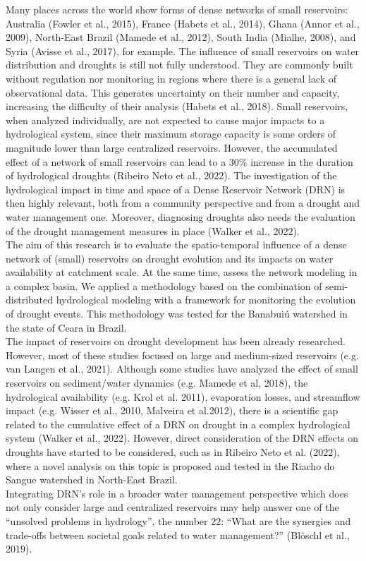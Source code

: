 \documentclass[draft]{agujournal2019}
\begin{document}
Many places across the world show forms of dense networks of small reservoirs: Australia (Fowler et al., 2015), France (Habets et al., 2014), Ghana (Annor et al., 2009), North-East Brazil (Mamede et al., 2012), South India (Mialhe, 2008), and Syria (Avisse et al., 2017), for example. The influence of small reservoirs on water distribution and droughts is still not fully understood. They are commonly built without regulation nor monitoring in regions where there is a general lack of observational data. This generates uncertainty on their number and capacity, increasing the difficulty of their analysis (Habets et al., 2018). Small reservoirs, when analyzed individually, are not expected to cause major impacts to a hydrological system, since their maximum storage capacity is some orders of magnitude lower than large centralized reservoirs. However, the accumulated effect of a network of small reservoirs can lead to a 30\% increase in the duration of hydrological droughts (Ribeiro Neto et al., 2022). The investigation of the hydrological impact in time and space of a Dense Reservoir Network (DRN) is then highly relevant, both from a community perspective and from a drought and water management one. Moreover, diagnosing droughts also needs the evaluation of the drought management measures in place (Walker et al., 2022).\\
The aim of this research is to evaluate the spatio-temporal influence of a dense network of (small) reservoirs on drought evolution and its impacts on water availability at catchment scale. At the same time, assess the network modeling in a complex basin. We applied a methodology based on the combination of semi-distributed hydrological modeling with a framework for monitoring the evolution of drought events. This methodology was tested for the Banabuiú watershed in the state of Ceara in Brazil.\\
The impact of reservoirs on drought development has been already researched. However, most of these studies focused on large and medium-sized reservoirs (e.g. van Langen et al., 2021). Although some studies have analyzed the effect of small reservoirs on sediment/water dynamics (e.g. Mamede et al, 2018), the hydrological availability (e.g. Krol et al. 2011), evaporation losses, and streamflow impact (e.g. Wisser et al., 2010, Malveira et al.2012), there is a scientific gap related to the cumulative effect of a DRN on drought in a complex hydrological system (Walker et al., 2022). However, direct consideration of the DRN effects on droughts have started to be considered, such as in Ribeiro Neto et al. (2022), where a novel analysis on this topic is proposed and tested in the Riacho do Sangue watershed in North-East Brazil.\\
Integrating DRN's role in a broader water management perspective which does not only consider large and centralized reservoirs may help answer one of the “unsolved problems in hydrology”, the number 22: “What are the synergies and trade-offs between societal goals related to water management?” (Blöschl et al., 2019).
\end{document}
